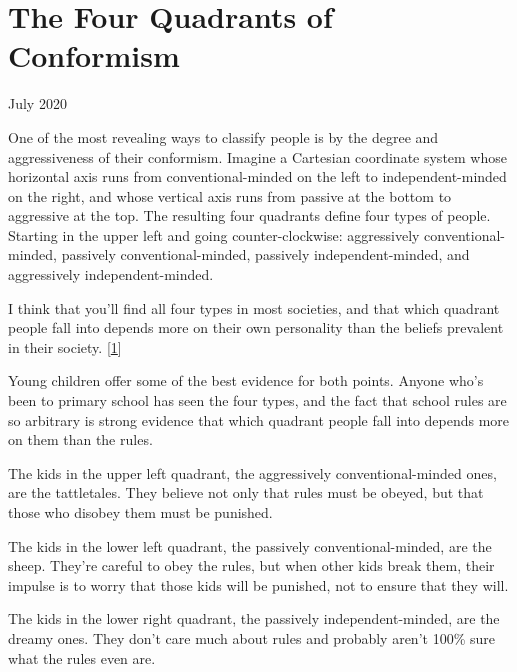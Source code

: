 \chapter{The Four Quadrants of Conformism}


            
              
                

July 2020

One of the most revealing ways to
                  classify people is by the degree and aggressiveness of their
                  conformism. Imagine a Cartesian coordinate system whose
                  horizontal axis runs from conventional-minded on the left to
                  independent-minded on the right, and whose vertical axis runs
                  from passive at the bottom to aggressive at the top. The
                  resulting four quadrants define four types of people. Starting
                  in the upper left and going counter-clockwise: aggressively
                  conventional-minded, passively conventional-minded, passively
                  independent-minded, and aggressively independent-minded.

I
                  think that you'll find all four types in most societies, and
                  that which quadrant people fall into depends more on their own
                  personality than the beliefs prevalent in their society.
                  [\href{\#f1n}{1}]

Young children offer some of the best evidence
                  for both points. Anyone who's been to primary school has seen
                  the four types, and the fact that school rules are so
                  arbitrary is strong evidence that which quadrant people fall
                  into depends more on them than the rules.

The kids
                  in the upper left quadrant, the aggressively
                  conventional-minded ones, are the tattletales. They believe
                  not only that rules must be obeyed, but that those who disobey
                  them must be punished.

The kids in the lower left
                  quadrant, the passively conventional-minded, are the sheep.
                  They're careful to obey the rules, but when other kids break
                  them, their impulse is to worry that those kids will be
                  punished, not to ensure that they will.

The kids in
                  the lower right quadrant, the passively independent-minded,
                  are the dreamy ones. They don't care much about rules and
                  probably aren't 100\% sure what the rules even are.

